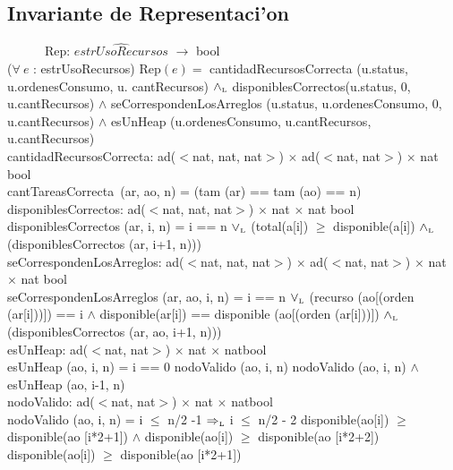 \documentclass[a4paper,10pt]{article}
\newcommand{\sombrero}{\widehat}
\begin{document}
\subsection{Invariante de Representaci'on}

    \indent \ \ \ \ \ \ Rep: $\sombrero{estrUsoRecursos}$ $\rightarrow$ bool \\
    
($\forall\ e$ : estrUsoRecursos) Rep$(e) =$ cantidadRecursosCorrecta (u.status, u.ordenesConsumo, u. cantRecursos) $\land_{\mathrm{\scriptscriptstyle{L}}}$ disponiblesCorrectos(u.status, 0, u.cantRecursos) $\wedge$ seCorrespondenLosArreglos (u.status, u.ordenesConsumo, 0, u.cantRecursos) $\wedge$ esUnHeap (u.ordenesConsumo, u.cantRecursos, u.cantRecursos) \\

cantidadRecursosCorrecta: ad($<$nat, nat, nat$>$) $\times$ ad($<$nat, nat$>$) $\times$ nat \en bool\\
	\indent cantTareasCorrecta\ (ar, ao, n) = (tam (ar) == tam (ao) == n) \\    

disponiblesCorrectos: ad($<$nat, nat, nat$>$) $\times$ nat $\times$ nat \en bool\\
	\indent disponiblesCorrectos (ar, i, n) = i == n $\lor_{\mathrm{\scriptscriptstyle{L}}}$ (total(a[i]) $\geq$ disponible(a[i]) $\land_{\mathrm{\scriptscriptstyle{L}}}$ (disponiblesCorrectos (ar, i+1, n)))  \\    

seCorrespondenLosArreglos: ad($<$nat, nat, nat$>$) $\times$ ad($<$nat, nat$>$) $\times$ nat $\times$ nat \en bool\\
	\indent seCorrespondenLosArreglos (ar, ao, i, n) = i == n $\lor_{\mathrm{\scriptscriptstyle{L}}}$ (recurso (ao[(orden (ar[i]))]) == i $\wedge$ disponible(ar[i]) == disponible (ao[(orden (ar[i]))]) $\land_{\mathrm{\scriptscriptstyle{L}}}$ (disponiblesCorrectos (ar, ao, i+1, n)))  \\   

 
esUnHeap: ad($<$nat, nat$>$) $\times$ nat $\times$ nat\en bool\\
	\indent esUnHeap (ao, i, n) = \lif i == 0 \lthen nodoValido (ao, i, n) \lelse nodoValido (ao, i, n) $\wedge$ esUnHeap (ao, i-1, n) \lfi \\ 

nodoValido: ad($<$nat, nat$>$) $\times$ nat $\times$ nat\en bool\\
	\indent nodoValido (ao, i, n) = i $\leq$ n/2 -1 $\Rightarrow_{\mathrm{\scriptscriptstyle{L}}}$ \lif i $\leq$ n/2 - 2 \lthen disponible(ao[i]) $\geq$ disponible(ao [i*2+1]) $\wedge$ disponible(ao[i]) $\geq$ disponible(ao [i*2+2]) \lelse disponible(ao[i]) $\geq$ disponible(ao [i*2+1]) \lfi
\end{document}
